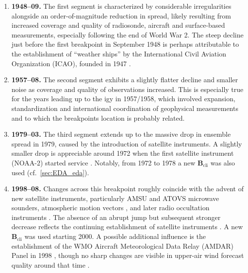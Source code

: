\begin{enumerate}

    \item \textbf{1948--09.} The first segment is characterized by considerable irregularities
          alongside an order-of-magnitude reduction in spread, likely resulting
          from increased coverage and quality of radiosonde, aircraft and
          surface-based measurements, especially following the end of World War
          2. The steep decline just before the first breakpoint in September 1948
          is perhaps attributable to the establishment of \enquote{weather ships} by the
          International Civil Aviation Organization (ICAO), founded in 1947
          \parencite{downesHistoryBritishOcean1977}.

    \item \textbf{1957--08.} The second segment exhibits a slightly flatter decline and
          smaller noise as coverage and quality of observations increased. This
          is especially true for the years leading up to the \gls{igy} in 1957/1958,
          which involved expansion, standardization and international coordination
          of geophysical measurements \parencite{joselynIUGGEvolves194020002019} and to which the breakpoints location is probably related.

    \item \textbf{1979--03.} The third segment extends up to the massive drop in ensemble
          spread in 1979, caused by the introduction of satellite instruments. A
          slightly smaller drop is appreciable around 1972 when the first
          satellite instrument (NOAA-2) started service \parencite{bellERA5GlobalReanalysis2021}.
          Notably, from 1972 to 1978 a new $\mathbf{B}_{\text{cli}}$ was also used
          (cf.~\cref{sec:EDA_eda}).

    \item \textbf{1998--08.} Changes across this breakpoint roughly coincide with the advent
          of new satellite instruments, particularly AMSU
          \parencite{duncanAssimilationAMSUaAllsky2022} and ATOVS
          \parencite{englishComparisonImpactTOVS2000} microwave sounders,
          atmospheric motion vectors \parencite{bormannAtmosphericMotionVectors2014},
          and later radio occultation instruments
          \parencite{anthesCOSMICFORMOSAT3Mission2008}. The absence of an abrupt
          jump but subsequent stronger decrease reflects the continuing
          establishment of satellite instruments
          \parencite{hersbachERA5GlobalReanalysis2020}. A new $\mathbf{B}_{\text{cli}}$
          was used starting 2000. A possible additional influence is the
          establishment of the WMO Aircraft Meteorological Data Relay (AMDAR)
          Panel in 1998 \parencite{worldmeteorologicalorganizationAircraftMeteorologicalData2003},
          though no sharp changes are visible in upper-air wind forecast quality
          around that time \parencite{petersenImpactBenefitsAMDAR2016}.


\end{enumerate}
